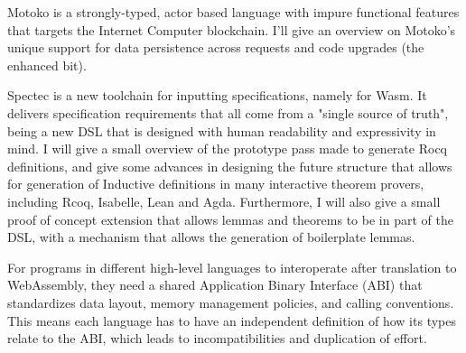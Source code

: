 \documentclass[a4paper,UKenglish]{dagrep-v2018}
\begin{document}
\license
{}

Motoko is a strongly-typed, actor based language with impure functional features that targets the Internet Computer blockchain. I’ll give an overview on Motoko’s unique support for data persistence across requests and code upgrades (the enhanced bit).

\license

Spectec is a new toolchain for inputting specifications, namely for Wasm. It delivers specification requirements that all come from a "single source of truth", being a new DSL that is designed with human readability and expressivity in mind. I will give a small overview of the prototype pass made to generate Rocq definitions, and give some advances in designing the future structure that allows for generation of Inductive definitions in many interactive theorem provers, including Rcoq, Isabelle, Lean and Agda. Furthermore, I will also give a small proof of concept extension that allows lemmas and theorems to be in part of the DSL, with a mechanism that allows the generation of boilerplate lemmas.

\license
{}

For programs in different high-level languages to interoperate after translation to WebAssembly, they need a shared Application Binary Interface (ABI) that standardizes data layout, memory management policies, and calling conventions. This means each language has to have an independent definition of how its types relate to the ABI, which leads to incompatibilities and duplication of effort.
\end{document}
